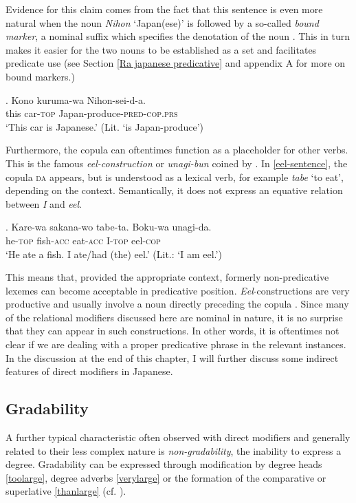 Evidence for this claim comes from the fact that this sentence is even more natural when the noun \textit{Nihon} `Japan(ese)’ is followed by a so-called \textit{bound marker}, a nominal suffix which specifies the denotation of the noun \citep{nagano:2016:are, shimada:2018:relational}. This in turn makes it easier for the two nouns to be established as a set and facilitates predicate use (see Section \ref{Ra japanese predicative} and appendix A for more on bound markers.)

\exg. Kono kuruma-wa Nihon-sei-d-a.\\
this car-\textsc{top} Japan-produce-\textsc{pred-cop.prs}\\
`This car is Japanese.’ (Lit. `is Japan-produce’)

Furthermore, the copula can oftentimes function as a placeholder for other verbs. This is the famous \textit{eel-construction} or \textit{unagi-bun} coined by \citet{okutsu:1978:boku}. In \ref{eel-sentence}, the copula \textsc{da} appears, but is understood as a lexical verb, for example \textit{tabe} `to eat’, depending on the context. Semantically, it does not express an equative relation between \textit{I} and \textit{eel}. 

\exg. Kare-wa sakana-wo tabe-ta. Boku-wa unagi-da.\\
he-\textsc{top} fish-\textsc{acc} eat-\textsc{acc} I-\textsc{top} eel-\textsc{cop}\\
`He ate a fish. I ate/had (the) eel.’ (Lit.: `I am eel.’) \label{eel-sentence}

This means that, provided the appropriate context, formerly non-predicative lexemes can become acceptable in predicative position. \textit{Eel}-constructions are very productive and usually involve a noun directly preceding the copula \citep[23–29]{okutsu:1978:boku}. Since many of the relational modifiers discussed here are nominal in nature, it is no surprise that they can appear in such constructions. In other words, it is oftentimes not clear if we are dealing with a proper predicative phrase in the relevant instances. In the discussion at the end of this chapter, I will further discuss some indirect features of direct modifiers in Japanese.

\subsection{Gradability} \label{gradability}

A further typical characteristic often observed with direct modifiers and generally related to their less complex nature is \textit{non-gradability}, the inability to express a degree. Gradability can be expressed through modification by degree heads \ref{toolarge}, degree adverbs \ref{verylarge} or the formation of the comparative or superlative \ref{thanlarge} (cf. \citealt{baker:2003:cat}).


